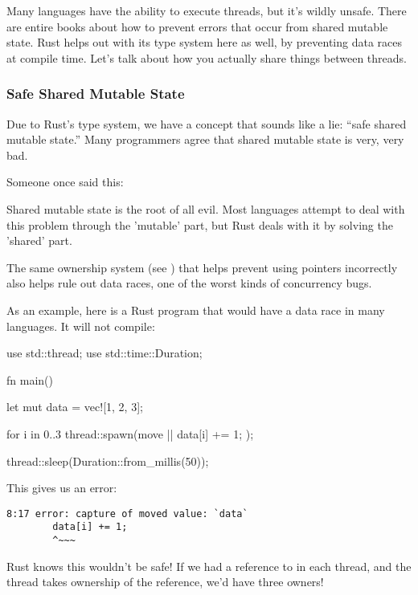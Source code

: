 Many languages have the ability to execute threads, but it's wildly unsafe. There are entire books about how to prevent errors that 
occur from shared mutable state. Rust helps out with its type system here as well, by preventing data races at compile time. Let's 
talk about how you actually share things between threads.

\subsubsection*{Safe Shared Mutable State}

Due to Rust's type system, we have a concept that sounds like a lie: \enquote{safe shared mutable state.} Many programmers agree 
that shared mutable state is very, very bad.

\blank

Someone once said this:

\begin{myquote}
Shared mutable state is the root of all evil. Most languages attempt to deal with this problem through the 'mutable' part, but 
Rust deals with it by solving the 'shared' part.
\end{myquote}

The same ownership system (see ) that helps prevent using pointers incorrectly also helps rule out 
data races, one of the worst kinds of concurrency bugs.

\blank

As an example, here is a Rust program that would have a data race in many languages. It will not compile:

\begin{rustc}
use std::thread;
use std::time::Duration;

fn main() {
    let mut data = vec![1, 2, 3];

    for i in 0..3 {
        thread::spawn(move || {
            data[i] += 1;
        });
    }

    thread::sleep(Duration::from_millis(50));
}
\end{rustc}

This gives us an error:

\begin{verbatim}
8:17 error: capture of moved value: `data`
        data[i] += 1;
        ^~~~
\end{verbatim}

Rust knows this wouldn't be safe! If we had a reference to  in each thread, and the thread takes ownership of the reference, 
we'd have three owners!

